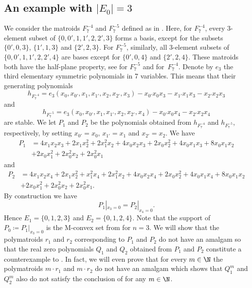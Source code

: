 \subsection{An example with \texorpdfstring{$|E_0|=3$}{E0=3}}
We consider the matroids $F_7^{-4}$ and $F_7^{-5}$ defined as in . Here, for $F_7^{-4}$, every 3-element subset of $\{0,0',1,1',2,2',3\}$ forms a basis, except for the subsets $\{0',0,3\}$, $\{1',1,3\}$ and $\{2',2,3\}$. For $F_7^{-5}$, similarly, all 3-element subsets of $\{0,0',1,1',2,2',4\}$ are bases except for $\{0',0,4\}$ and $\{2',2,4\}$. These matroids both have the half-plane property, see \cite[\S A.2.2]{HPPlong} for $F_7^{-5}$ and \cite{wagnerwei} for~$F_7^{-4}$. Denote by $e_3$ the third elementary symmetric polynomials in 7 variables. This means that their generating polynomials
\begin{equation*}
    h_{F_7^{-4}}=e_3(x_0,x_{0'},x_1,x_{1'},x_2,x_{2'},x_3)-x_{0'}x_0x_3-x_{1'}x_1x_3-x_{2'}x_2x_3
\end{equation*}
and
\begin{equation*}
    h_{F_7^{-5}}=e_3(x_0,x_{0'},x_1,x_{1'},x_2,x_{2'},x_4)-x_{0'}x_0x_4-x_{2'}x_2x_4
\end{equation*}
are stable. We let $P_1$ and $P_2$ be the polynomials obtained from $h_{F_7^{-4}}$ and $h_{F_7^{-5}}$, respectively, by setting $x_{0'}=x_0$, $x_{1'}=x_1$ and $x_{2'}=x_2$. We have
\begin{align*}
    P_1&=4x_1x_2x_3+2x_1x_2^2+2x_1^2x_2+4x_0x_2x_3+2x_0x_2^2+4x_0x_1x_3+8x_0x_1x_2\\
    &+2x_0x_1^2+2x_0^2x_2+2x_0^2x_1
\end{align*}
and
\begin{align*}
    P_2&=4x_1x_2x_4+2x_1x_2^2+x_1^2x_4+2x_1^2x_2+4x_0x_2x_4+2x_0x_2^2+4x_0x_1x_4+8x_0x_1x_2\\
    &+2x_0x_1^2+2x_0^2x_2+2x_0^2x_1.
\end{align*}
By construction we have
\begin{equation*}
    P_1|_{x_3=0}=P_2|_{x_4=0}.
\end{equation*}
Hence $E_1=\{0,1,2,3\}$ and $E_2=\{0,1,2,4\}$. Note that the support of $P_0\coloneqq P_1|_{x_3=0}$ is the M-convex set from  for $n=3$. We will show that the polymatroids $r_1$ and $r_2$ corresponding to $P_1$ and $P_2$ do not have an amalgam so that the real zero polynomials $Q_1$ and $Q_2$ obtained from $P_1$ and $P_2$ constitute a counterexample to . In fact, we will even prove that for every $m\in\N$ the polymatroids $m\cdot r_1$ and $m\cdot r_2$ do not have an amalgam which shows that $Q_1^m$ and $Q_2^m$ also do not satisfy the conclusion of  for any $m\in\N$.

